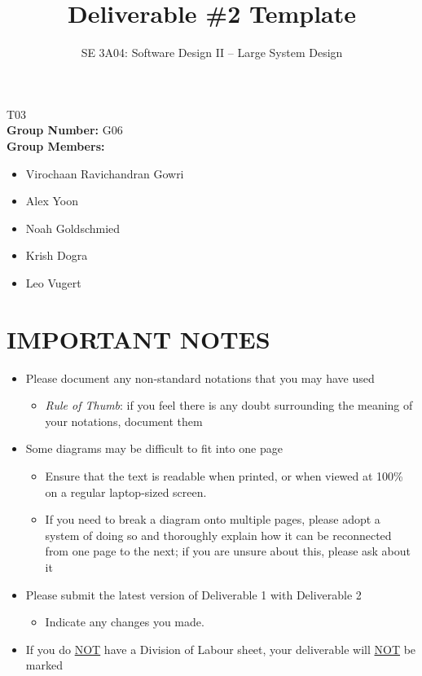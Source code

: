 \documentclass[]{article}
\title{Deliverable \#2 Template}
\author{SE 3A04: Software Design II -- Large System Design}
\date{}
\begin{document}
\maketitle	
{} T03\\
{\bf Group Number:} G06 \\
{\bf Group Members:}
\begin{itemize}
	\item Virochaan Ravichandran Gowri
	\item Alex Yoon
	\item Noah Goldschmied
	\item Krish Dogra
	\item Leo Vugert
\end{itemize}

\section*{IMPORTANT NOTES}
\begin{itemize}
	\item Please document any non-standard notations that you may have used
	\begin{itemize}
		\item \emph{Rule of Thumb}: if you feel there is any doubt surrounding the meaning of your notations, document them
	\end{itemize}
	\item Some diagrams may be difficult to fit into one page
	\begin{itemize}
		\item Ensure that the text is readable when printed, or when viewed at 100\% on a regular laptop-sized screen.
		\item If you need to break a diagram onto multiple pages, please adopt a system of doing so and thoroughly explain how it can be reconnected from one page to the next; if you are unsure about this, please ask about it
	\end{itemize}
	\item Please submit the latest version of Deliverable 1 with Deliverable 2
	\begin{itemize}
		\item Indicate any changes you made.
	\end{itemize}
	\item If you do \underline{NOT} have a Division of Labour sheet, your deliverable will \underline{NOT} be marked
\end{itemize}
\end{document}
